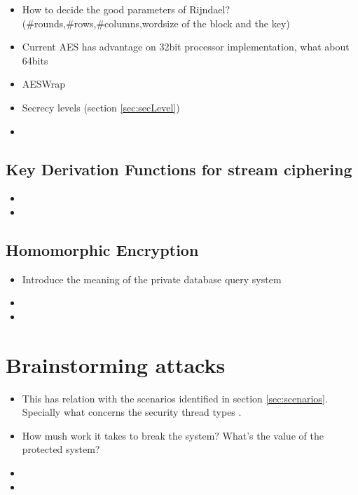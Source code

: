 \documentclass[10pt,a4paper,twoside]{llncs}
\begin{document}
\begin{itemize}
    \item How to decide the good parameters of Rijndael? (\#rounds,\#rows,\#columns,wordsize of the block and the key) \cite{gRijndael}
    \item Current AES has advantage on 32bit processor implementation, what about 64bits
    \item AESWrap \cite{rfc3394}
    \item Secrecy levels (section \ref{sec:secLevel})
    \item 
\end{itemize}

%
\subsection{Key Derivation Functions for stream ciphering \label{sec:kdfStreaming}}

\begin{itemize}
    \item 
    \item 
\end{itemize}

%
\subsection{Homomorphic Encryption \label{sec:Homorph}}

\begin{itemize}
    \item Introduce the meaning of the private database query system \cite{iacr422}
    \item 
    \item 
\end{itemize}

%
\section{Brainstorming attacks \label{sec:attacks}}

\begin{itemize}
    \item This has relation with the scenarios identified in section \ref{sec:scenarios}. Specially what concerns the security thread types \cite{SecEngRossAnderson}.
    \item How mush work it takes to break the system? What's the value of the protected system?
    \item 
    \item
\end{itemize}
\end{document}
